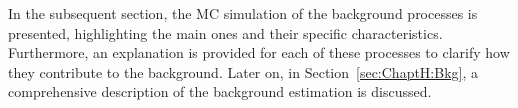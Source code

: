\begin{comment} %
In our analysis, background events are classified into two distinct types:  
``reducible'' backgrounds and ``irreducible'' backgrounds.

Reducible backgrounds refer to situations where particles in the event 
simulation mimic the characteristics of the particles we are specifically 
interested in. For example, a high-energy electron can produce a signature 
that closely resembles that of a high-energy photon, leading to misidentification.

On the other hand, irreducible backgrounds involve physical objects that are of 
the same nature as the particles we are targeting. These backgrounds cannot be 
easily distinguished from our signal events based on their properties alone.

In the \dileptau channel, the dominant backgrounds consist of reducible events 
where jets misidentified as \tauhad are present. This is particularly observed in 
the \ttbar and \Zjets backgrounds. Additionally, other backgrounds include processes 
involving dibosons (VV) and \ttX production, such 
as \ttH, \ttZ, and \ttW.
\end{comment}

 


In the subsequent section, the MC simulation of the background processes 
is presented, highlighting the main ones and their specific characteristics. Furthermore, an 
explanation is provided for each of these processes to clarify how they contribute
to the background. Later on, in Section~\ref{sec:ChaptH:Bkg}, a 
comprehensive description of the background estimation is discussed. %


